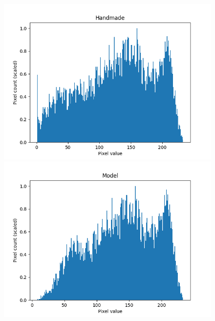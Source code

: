 \begin{figure}[!ht]
	\centering
	\begin{minipage}{0.32\textwidth}
		\centering
		\includegraphics[width=\linewidth]{Immagini/handmade_scaled_hist.png}
	\end{minipage}
	\hfill %
	\begin{minipage}{0.32\textwidth}
		\centering
		\includegraphics[width=\linewidth]{Immagini/model_scaled_hist.png}
	\end{minipage}
	\hfill %
	\begin{minipage}{0.32\textwidth}
		\centering

\end{minipage}
\end{figure}
